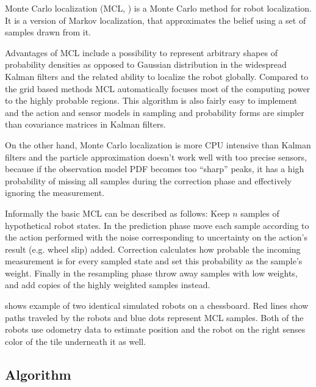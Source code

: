 Monte Carlo localization (MCL, \cite{dellaert99}) is a Monte Carlo method for
robot localization.
It is a version of Markov localization, that approximates the belief
using a set of samples drawn from it.

Advantages of MCL include a
possibility to represent arbitrary shapes of probability densities as opposed to
Gaussian distribution in the widespread Kalman filters
and the related ability to localize the robot globally.
Compared to the grid based methods MCL automatically focuses most of the
computing power to the highly probable regions.
This algorithm is also fairly easy to implement and the action and sensor models
in sampling and probability forms are simpler than covariance matrices in
Kalman filters.

On the other hand, Monte Carlo localization is more CPU intensive than Kalman filters
and the particle approximation doesn't work well with too precise sensors,
because if the observation model PDF becomes too \enquote{sharp} peaks, it has a high probability
of missing all samples during the correction phase and effectively ignoring the measurement.

Informally the basic MCL can be described as follows:
Keep \(n\) samples of hypothetical robot states.
In the prediction phase move each sample according to the action performed with the noise corresponding
to uncertainty on the action's result (e.g. wheel slip) added.
Correction calculates how probable the incoming measurement is
for every sampled state and set this probability as the sample's weight.
Finally in the resampling phase throw away samples with low weights, and add
copies of the highly weighted samples instead.

 shows example of two identical simulated robots on a chessboard.
Red lines show paths traveled by the robots and blue dots represent MCL samples.
Both of the robots use odometry data to estimate position and the robot on the right
senses color of the tile underneath it as well.

\subsection{Algorithm}

